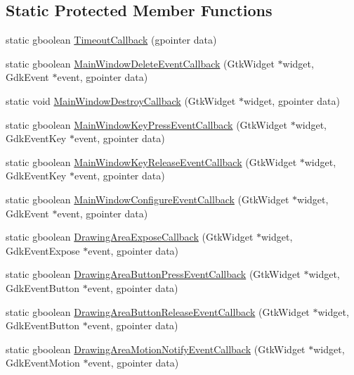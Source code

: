 \subsection*{Static Protected Member Functions}
\begin{DoxyCompactItemize}
\item 
static gboolean \hyperlink{classCApplicationData_af66e15f6935f053b46a11aaa51a869c9}{Timeout\+Callback} (gpointer data)
\item 
static gboolean \hyperlink{classCApplicationData_a4b2110c03e030cf11b733955963f8854}{Main\+Window\+Delete\+Event\+Callback} (Gtk\+Widget $\ast$widget, Gdk\+Event $\ast$event, gpointer data)
\item 
static void \hyperlink{classCApplicationData_a379327c78dc57aa9dcef77e1b98efa2d}{Main\+Window\+Destroy\+Callback} (Gtk\+Widget $\ast$widget, gpointer data)
\item 
static gboolean \hyperlink{classCApplicationData_aca6cce5b1cd5142984d2880294ff6ed4}{Main\+Window\+Key\+Press\+Event\+Callback} (Gtk\+Widget $\ast$widget, Gdk\+Event\+Key $\ast$event, gpointer data)
\item 
static gboolean \hyperlink{classCApplicationData_a4b2c76db5c2efd75404502e36700f99b}{Main\+Window\+Key\+Release\+Event\+Callback} (Gtk\+Widget $\ast$widget, Gdk\+Event\+Key $\ast$event, gpointer data)
\item 
static gboolean \hyperlink{classCApplicationData_a31b48405b43d73cabca4c080c1b9beee}{Main\+Window\+Configure\+Event\+Callback} (Gtk\+Widget $\ast$widget, Gdk\+Event $\ast$event, gpointer data)
\item 
static gboolean \hyperlink{classCApplicationData_af2ec09e61420f6c493d7ef25e4a7bd11}{Drawing\+Area\+Expose\+Callback} (Gtk\+Widget $\ast$widget, Gdk\+Event\+Expose $\ast$event, gpointer data)
\item 
static gboolean \hyperlink{classCApplicationData_aaa867e992733fa1e88e67c026c8a2947}{Drawing\+Area\+Button\+Press\+Event\+Callback} (Gtk\+Widget $\ast$widget, Gdk\+Event\+Button $\ast$event, gpointer data)
\item 
static gboolean \hyperlink{classCApplicationData_a2708d2083c8c2e7c8de126b40eb17b3f}{Drawing\+Area\+Button\+Release\+Event\+Callback} (Gtk\+Widget $\ast$widget, Gdk\+Event\+Button $\ast$event, gpointer data)
\item 
static gboolean \hyperlink{classCApplicationData_a463a4bc8eabe67f9f22c46d96f5eff88}{Drawing\+Area\+Motion\+Notify\+Event\+Callback} (Gtk\+Widget $\ast$widget, Gdk\+Event\+Motion $\ast$event, gpointer data)

\end{DoxyCompactItemize}
